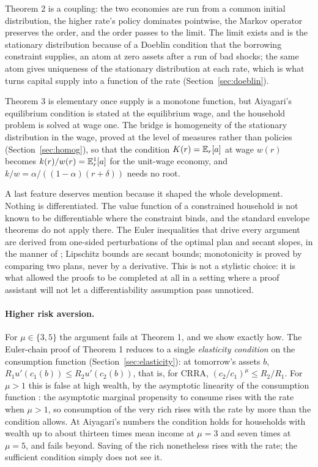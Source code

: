 Theorem 2 is a coupling: the two economies are run from a common initial distribution, the higher
rate's policy dominates pointwise, the Markov operator preserves the order, and the order passes to
the limit. The limit exists and is the stationary distribution because of a Doeblin condition that
the borrowing constraint supplies, an atom at zero assets after a run of bad shocks; the same
atom gives uniqueness of the stationary distribution at each rate, which is what turns capital
supply into a function of the rate (Section~\ref{sec:doeblin}).

Theorem 3 is elementary once supply is a monotone function, but Aiyagari's equilibrium condition is
stated at the equilibrium wage, and the household problem is solved at wage one. The bridge is
homogeneity of the stationary distribution in the wage, proved at the level of measures rather than
policies (Section~\ref{sec:homog}), so that the condition $K(r)=\mathbb{E}_r[a]$ at wage $w(r)$ becomes
$k(r)/w(r)=\mathbb{E}^{1}_r[a]$ for the unit-wage economy, and $k/w=\alpha/((1-\alpha)(r+\delta))$ needs no
root.

A last feature deserves mention because it shaped the whole development. Nothing is differentiated.
The value function of a constrained household is not known to be differentiable where the
constraint binds, and the standard envelope theorems do not apply there. The Euler inequalities
that drive every argument are derived from one-sided perturbations of the optimal plan and secant
slopes, in the manner of \citet{ClausenStrub2020}; Lipschitz bounds are secant bounds; monotonicity
is proved by comparing two plans, never by a derivative. This is not a stylistic choice: it is what
allowed the proofs to be completed at all in a setting where a proof assistant will not let a
differentiability assumption pass unnoticed.

\paragraph{Higher risk aversion.}
For $\mu\in\{3,5\}$ the argument fails at Theorem 1, and we show exactly how. The Euler-chain proof
of Theorem 1 reduces to a single \emph{elasticity condition} on the consumption function
(Section~\ref{sec:elasticity}): at tomorrow's assets $b$,
$R_1u'(c_1(b))\le R_2u'(c_2(b))$, that is, for CRRA, $(c_2/c_1)^\mu\le R_2/R_1$. For $\mu>1$ this
is false at high wealth, by the asymptotic linearity of the consumption function
\citep{MaToda2022}: the asymptotic marginal propensity to consume rises with the rate when $\mu>1$,
so consumption of the very rich rises with the rate by more than the condition allows. At
Aiyagari's numbers the condition holds for households with wealth up to about thirteen times mean
income at $\mu=3$ and seven times at $\mu=5$, and fails beyond. Saving of the rich nonetheless
rises with the rate; the sufficient condition simply does not see it.

